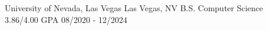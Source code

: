 \eduheader
{University of Nevada, Las Vegas}
{Las Vegas, NV}
{B.S. Computer Science \hspace{0.1em} \textbar\ \hspace{0.1em} 3.86/4.00 GPA}
{08/2020 - 12/2024}